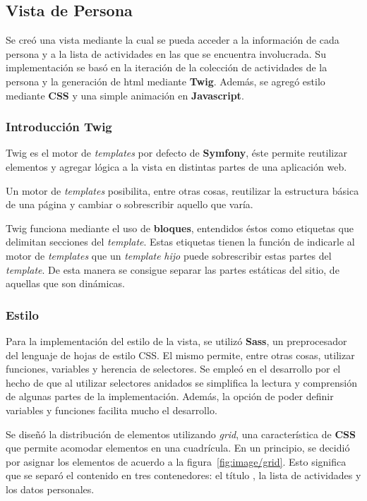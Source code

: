 

\subsection{Vista de Persona}
\label{sub:vista_persona}
Se creó una vista mediante la cual se pueda acceder a la información de cada persona y a la lista de actividades en las que se encuentra involucrada. Su
implementación se basó en la iteración de la colección de actividades  de la persona y la generación de html mediante \textbf{Twig}\@. Además,
se agregó estilo mediante \textbf{CSS} y una simple animación en \textbf{Javascript}.

\subsubsection{Introducción Twig}%
\label{ssub:introducción_twig}

Twig es el motor de \textit{templates} por defecto de \textbf{Symfony}, éste permite reutilizar elementos y agregar lógica a la vista en distintas partes de una aplicación web\@.


Un motor de \textit{templates} posibilita, entre otras cosas, reutilizar la estructura básica de una página y cambiar o sobrescribir aquello que varía.

Twig funciona mediante el uso de \textbf{bloques}, entendidos éstos como etiquetas que delimitan secciones del \textit{template}\@. Estas etiquetas tienen la función de indicarle al
motor de \textit{templates} que un \textit{template} \textit{hijo} puede sobrescribir estas partes del \textit{template}\@. De esta manera se consigue separar las partes estáticas
del sitio, de aquellas que son dinámicas.

\subsubsection{Estilo}%
\label{ssub:estilo}

Para la implementación del estilo de la vista, se utilizó \textbf{Sass}, un preprocesador del lenguaje de hojas de estilo CSS. El mismo permite, entre otras cosas, utilizar
funciones, variables y herencia de selectores. Se empleó en el desarrollo por el hecho de que al utilizar selectores anidados se simplifica
la lectura y comprensión de algunas partes de la implementación. Además, la opción de poder definir variables y funciones facilita mucho el desarrollo.


Se diseñó la distribución de elementos utilizando \textit{grid}, una característica de \textbf{CSS} que permite acomodar elementos en una cuadrícula\@.
En un principio, se decidió por asignar los elementos de acuerdo a la figura~\ref{fig:image/grid}. Esto significa que se separó el contenido en tres contenedores: el título
, la lista de actividades y los datos personales.


